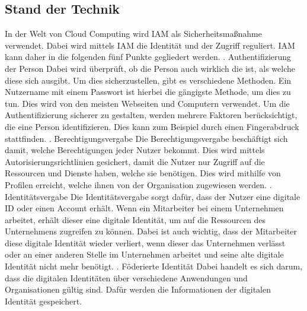 \subsection{Stand der Technik}
\label{sec:chapter04:Stand}
In der Welt von Cloud Computing wird \ac{IAM} als Sicherheitsmaßnahme verwendet.
Dabei wird mittels \ac{IAM} die Identität und der Zugriff reguliert.
\ac{IAM} kann daher in die folgenden fünf Punkte gegliedert werden.
\newline
{}. Authentifizierung der Person
\newline
Dabei wird überprüft, ob die Person auch wirklich die ist, als welche diese sich ausgibt.
Um dies sicherzustellen, gibt es verschiedene Methoden.
Ein Nutzername mit einem Passwort ist hierbei die gängigste Methode, um dies zu tun. Dies wird von den meisten Webseiten und Computern verwendet.
Um die Authentifizierung sicherer zu gestalten, werden mehrere Faktoren berücksichtigt, die eine Person identifizieren.
Dies kann zum Beispiel durch einen Fingerabdruck stattfinden. \cite{IamIEEE, S.1482} 
\newline
{}. Berechtigungsvergabe
\newline
Die Berechtigungsvergabe beschäftigt sich damit, welche Berechtigungen jeder Nutzer bekommt.
Dies wird mittels Autorisierungsrichtlinien gesichert, damit die Nutzer nur Zugriff auf die Ressourcen und Dienste haben, welche sie benötigen.
Dies wird mithilfe von Profilen erreicht, welche ihnen von der Organisation zugewiesen werden. \cite{IamIEEE, S.1482} 
\newline
{}. Identitätsvergabe
\newline
Die Identitätsvergabe sorgt dafür, dass der Nutzer eine digitale ID oder einen Account erhält.
Wenn ein Mitarbeiter bei einem Unternehmen arbeitet, erhält dieser eine digitale Identität, um auf die Ressourcen des Unternehmens zugreifen zu können.
Dabei ist auch wichtig, dass der Mitarbeiter diese digitale Identität wieder verliert, wenn dieser das Unternehmen verlässt oder an einer anderen Stelle im Unternehmen arbeitet und seine alte digitale Identität nicht mehr benötigt.
\newline
{}. Föderierte Identität
\newline
Dabei handelt es sich darum, dass die digitalen Identitäten über verschiedene Anwendungen und Organisationen gültig sind.
Dafür werden die Informationen der digitalen Identität gespeichert.
